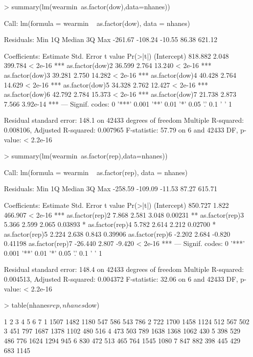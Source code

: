\documentclass[11pt]{article}
\begin{document}
\begin{Schunk}
\begin{Sinput}
> summary(lm(wearmin~as.factor(dow),data=nhanes))
\end{Sinput}
\begin{Soutput}
Call:
lm(formula = wearmin ~ as.factor(dow), data = nhanes)

Residuals:
    Min      1Q  Median      3Q     Max 
-261.67 -108.24  -10.55   86.38  621.12 

Coefficients:
                Estimate Std. Error t value Pr(>|t|)    
(Intercept)      818.882      2.048 399.784  < 2e-16 ***
as.factor(dow)2   36.599      2.764  13.240  < 2e-16 ***
as.factor(dow)3   39.281      2.750  14.282  < 2e-16 ***
as.factor(dow)4   40.428      2.764  14.629  < 2e-16 ***
as.factor(dow)5   34.328      2.762  12.427  < 2e-16 ***
as.factor(dow)6   42.792      2.784  15.373  < 2e-16 ***
as.factor(dow)7   21.738      2.873   7.566 3.92e-14 ***
---
Signif. codes:  0 '***' 0.001 '**' 0.01 '*' 0.05 '.' 0.1 ' ' 1

Residual standard error: 148.1 on 42433 degrees of freedom
Multiple R-squared:  0.008106,	Adjusted R-squared:  0.007965 
F-statistic: 57.79 on 6 and 42433 DF,  p-value: < 2.2e-16
\end{Soutput}
\begin{Sinput}
> summary(lm(wearmin~as.factor(rep),data=nhanes))
\end{Sinput}
\begin{Soutput}
Call:
lm(formula = wearmin ~ as.factor(rep), data = nhanes)

Residuals:
    Min      1Q  Median      3Q     Max 
-258.59 -109.09  -11.53   87.27  615.71 

Coefficients:
                Estimate Std. Error t value Pr(>|t|)    
(Intercept)      850.727      1.822 466.907  < 2e-16 ***
as.factor(rep)2    7.868      2.581   3.048  0.00231 ** 
as.factor(rep)3    5.366      2.599   2.065  0.03893 *  
as.factor(rep)4    5.782      2.614   2.212  0.02700 *  
as.factor(rep)5    2.224      2.638   0.843  0.39906    
as.factor(rep)6   -2.202      2.684  -0.820  0.41198    
as.factor(rep)7  -26.440      2.807  -9.420  < 2e-16 ***
---
Signif. codes:  0 '***' 0.001 '**' 0.01 '*' 0.05 '.' 0.1 ' ' 1

Residual standard error: 148.4 on 42433 degrees of freedom
Multiple R-squared:  0.004513,	Adjusted R-squared:  0.004372 
F-statistic: 32.06 on 6 and 42433 DF,  p-value: < 2.2e-16
\end{Soutput}
\begin{Sinput}
> table(nhanes$rep,nhanes$dow)
\end{Sinput}
\begin{Soutput}
       1    2    3    4    5    6    7
  1 1507 1482 1180  547  586  543  786
  2  722 1700 1458 1124  512  567  502
  3  451  797 1687 1378 1102  480  516
  4  473  503  789 1638 1368 1062  430
  5  398  529  486  776 1624 1294  945
  6  830  472  513  465  764 1545 1080
  7  847  882  398  445  429  683 1145
\end{Soutput}
\end{Schunk}
\end{document}
